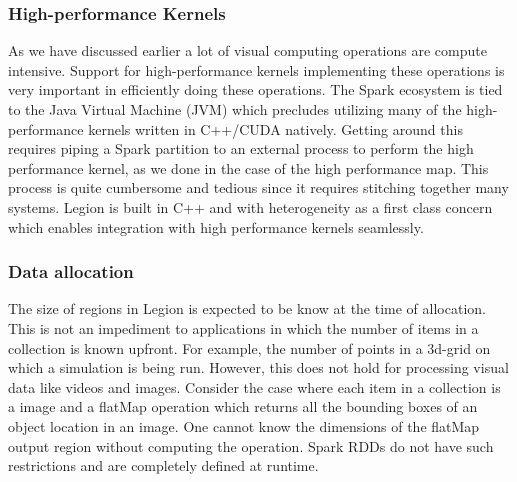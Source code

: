 \documentclass[tog]{acmsiggraph}
\begin{document}
\subsubsection{High-performance Kernels}
As we have discussed earlier a lot of visual computing operations are compute
intensive. Support for high-performance kernels implementing these operations is
very important in efficiently doing these operations. The Spark ecosystem is
tied to the Java Virtual Machine (JVM) which precludes utilizing many of the
high-performance kernels written in C++/CUDA natively. Getting around this
requires piping a Spark partition to an external process to  perform the
high performance kernel, as we done in the case of the high performance map.
This process is quite cumbersome and tedious since it requires stitching
together many systems. Legion is built in C++ and with heterogeneity as a first
class concern which enables integration with high performance kernels
seamlessly.

\subsubsection{Data allocation}
The size of regions in Legion is expected to be know at the time of allocation.
This is not an impediment to applications in which the number of items in a
collection is known upfront. For example, the number of points in a 3d-grid on
which a simulation is being run. However, this does not hold for processing
visual data like videos and images. Consider the case where each item in a
collection is a image and a flatMap operation which returns all the bounding
boxes of an object location in an image. One cannot know the dimensions of the
flatMap output region without computing the operation. Spark RDDs do not have
such restrictions and are completely defined at runtime.




\nocite{*}

\end{document}
